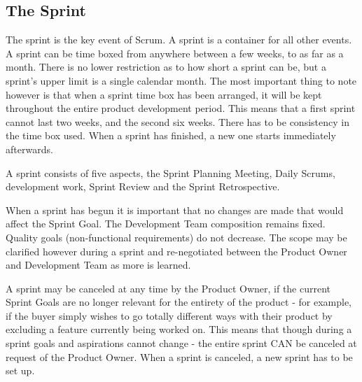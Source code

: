 \subsection{The Sprint}

The sprint is the key event of Scrum. 
A sprint is a container for all other events.
A sprint can be time boxed from anywhere between a few weeks, to as far as a month. 
There is no lower restriction as to how 
short a sprint can be, but a sprint's upper limit is a single calendar 
month\cite{scrumguide11}. The most important thing to note however is that 
when a sprint time box has been arranged, it will be kept throughout the 
entire product development period\cite{scrumguide11}. This means that a 
first sprint cannot last two weeks, and the second six weeks. There has to be 
consistency in the time box used. When a sprint has 
finished, a new one starts immediately afterwards\cite{scrumguide11}.


A sprint consists of five aspects, the Sprint Planning Meeting, Daily Scrums, 
development work, Sprint Review and the Sprint Retrospective\cite{scrumguide11}. 


When a sprint has begun it is important that no changes are made that would 
affect the Sprint Goal\cite{scrumguide11}. The Development Team composition 
remains fixed. Quality goals (non-functional requirements) do not 
decrease. The scope may be clarified however during a sprint and 
re-negotiated between the Product Owner and Development Team as more is 
learned\cite{scrumguide11}. 


A sprint may be canceled at any time by the Product Owner, if the current 
Sprint Goals are no longer relevant for the entirety of the product - for 
example, if the buyer simply wishes to go totally different ways with their 
product by excluding a feature currently being worked on\cite{scrumguide11}. 
This means that though during a sprint goals and aspirations cannot change - 
the entire sprint CAN be canceled at request of the Product 
Owner. When a sprint is canceled, a new sprint has to be 
set up\cite{scrumguide11}.



